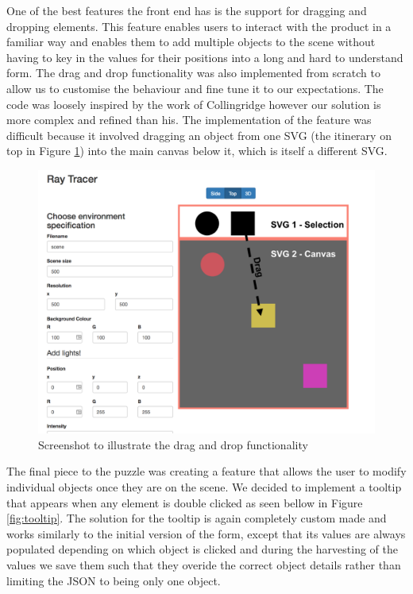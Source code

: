 \documentclass[a4paper]{report}
\begin{document}
	
	\par One of the best features the front end has is the support for dragging and dropping elements. This feature enables users to interact with the product in a familiar way and enables them to add multiple objects to the scene without having to key in the values for their positions into a long and hard to understand form. The drag and drop functionality was also implemented from scratch to allow us to customise the behaviour and fine tune it to our expectations. The code was loosely inspired by the work of Collingridge \cite{collingridge_draggable_2011} however our solution is more complex and refined than his. The implementation of the feature was difficult because it involved dragging an object from one SVG (the itinerary on top in Figure \ref{fig:drag_drop}) into the main canvas below it, which is itself a different SVG. \newline
	
	\begin{figure}[ht!]
		\centering
		\includegraphics[scale=0.30]{drag.png}
		\caption{Screenshot to illustrate the drag and drop functionality}
		\label{fig:drag_drop}
	\end{figure}
	
	
	\par The final piece to the puzzle was creating a feature that allows the user to modify individual objects once they are on the scene. We decided to implement a tooltip that appears when any element is double clicked as seen bellow in Figure \ref{fig:tooltip}. The solution for the tooltip is again completely custom made and works similarly to the initial version of the form, except that its values are always populated depending on which object is clicked and during the harvesting of the values we save them such that they overide the correct object details rather than limiting the JSON to being only one object.
	
\end{document}
